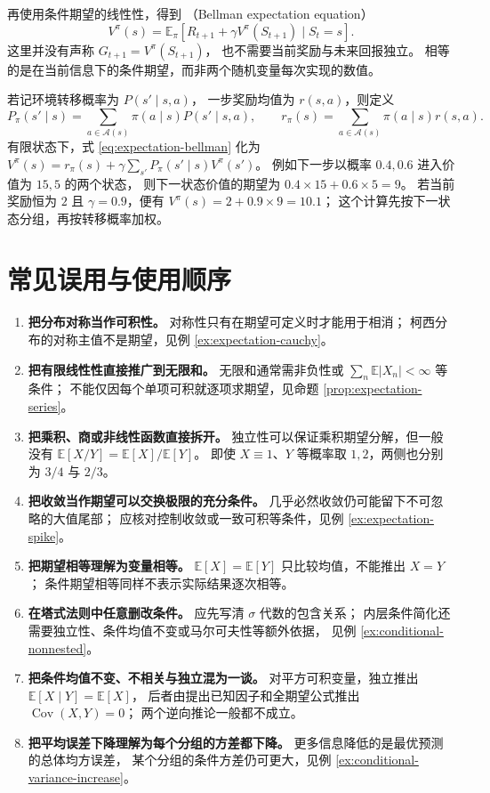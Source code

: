 \documentclass[UTF8]{ctexart}
\begin{document}
再使用条件期望的线性性，得到
（Bellman expectation equation）
\begin{equation}
  V^\pi(s)
  =\mathbb E_\pi[R_{t+1}+\gamma V^\pi(S_{t+1})\mid S_t=s].
  \label{eq:expectation-bellman}
\end{equation}
这里并没有声称 $G_{t+1}=V^\pi(S_{t+1})$，
也不需要当前奖励与未来回报独立。
相等的是在当前信息下的条件期望，而非两个随机变量每次实现的数值。

若记环境转移概率为 $P(s'\mid s,a)$，
一步奖励均值为 $r(s,a)$，则定义
\[
  P_\pi(s'\mid s)=\sum_{a\in\mathcal A(s)}\pi(a\mid s)P(s'\mid s,a),
  \qquad
  r_\pi(s)=\sum_{a\in\mathcal A(s)}\pi(a\mid s)r(s,a).
\]
有限状态下，式 \eqref{eq:expectation-bellman} 化为
$V^\pi(s)=r_\pi(s)+\gamma\sum_{s'}P_\pi(s'\mid s)V^\pi(s')$。
例如下一步以概率 $0.4,0.6$ 进入价值为 $15,5$ 的两个状态，
则下一状态价值的期望为 $0.4\times15+0.6\times5=9$。
若当前奖励恒为 $2$ 且 $\gamma=0.9$，便有 $V^\pi(s)=2+0.9\times9=10.1$；
这个计算先按下一状态分组，再按转移概率加权。

\section{常见误用与使用顺序}
\label{sec:expectation-pitfalls}

\begin{enumerate}
  \item \textbf{把分布对称当作可积性。}
  对称性只有在期望可定义时才能用于相消；
  柯西分布的对称主值不是期望，见例 \ref{ex:expectation-cauchy}。
  \item \textbf{把有限线性性直接推广到无限和。}
  无限和通常需非负性或 $\sum_n\mathbb E|X_n|<\infty$ 等条件；
  不能仅因每个单项可积就逐项求期望，见命题 \ref{prop:expectation-series}。
  \item \textbf{把乘积、商或非线性函数直接拆开。}
  独立性可以保证乘积期望分解，但一般没有
  $\mathbb E[X/Y]=\mathbb E[X]/\mathbb E[Y]$。
  即使 $X\equiv1$、$Y$ 等概率取 $1,2$，两侧也分别为 $3/4$ 与 $2/3$。
  \item \textbf{把收敛当作期望可以交换极限的充分条件。}
  几乎必然收敛仍可能留下不可忽略的大值尾部；
  应核对控制收敛或一致可积等条件，见例 \ref{ex:expectation-spike}。
  \item \textbf{把期望相等理解为变量相等。}
  $\mathbb E[X]=\mathbb E[Y]$ 只比较均值，不能推出 $X=Y$；
  条件期望相等同样不表示实际结果逐次相等。
  \item \textbf{在塔式法则中任意删改条件。}
  应先写清 $\sigma$ 代数的包含关系；
  内层条件简化还需要独立性、条件均值不变或马尔可夫性等额外依据，
  见例 \ref{ex:conditional-nonnested}。
  \item \textbf{把条件均值不变、不相关与独立混为一谈。}
  对平方可积变量，独立推出 $\mathbb E[X\mid Y]=\mathbb E[X]$，
  后者由提出已知因子和全期望公式推出 $\operatorname{Cov}(X,Y)=0$；
  两个逆向推论一般都不成立。
  \item \textbf{把平均误差下降理解为每个分组的方差都下降。}
  更多信息降低的是最优预测的总体均方误差，
  某个分组的条件方差仍可更大，见例 \ref{ex:conditional-variance-increase}。
\end{enumerate}
\end{document}
